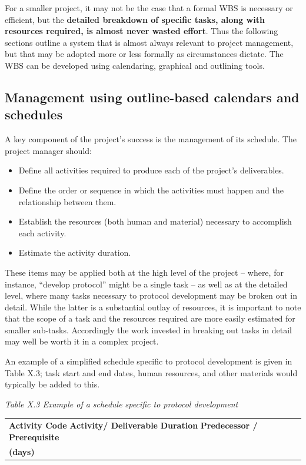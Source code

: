 \documentclass[]{book}
\begin{document}
For a smaller project, it may not be the case that a formal WBS is
necessary or efficient, but the \textbf{detailed breakdown of specific
tasks, along with resources required, is almost never wasted effort}.
Thus the following sections outline a system that is almost always
relevant to project management, but that may be adopted more or less
formally as circumstances dictate. The WBS can be developed using
calendaring, graphical and outlining tools.

\subsection{Management using outline-based calendars and
schedules}\label{management-using-outline-based-calendars-and-schedules}

A key component of the project's success is the management of its
schedule. The project manager should:

\begin{itemize}
\item
  Define all activities required to produce each of the project's
  deliverables.
\item
  Define the order or sequence in which the activities must happen and
  the relationship between them.
\item
  Establish the resources (both human and material) necessary to
  accomplish each activity.
\item
  Estimate the activity duration.
\end{itemize}

These items may be applied both at the high level of the project --
where, for instance, ``develop protocol'' might be a single task -- as
well as at the detailed level, where many tasks necessary to protocol
development may be broken out in detail. While the latter is a
substantial outlay of resources, it is important to note that the scope
of a task and the resources required are more easily estimated for
smaller sub-tasks. Accordingly the work invested in breaking out tasks
in detail may well be worth it in a complex project.

An example of a simplified schedule specific to protocol development is
given in Table X.3; task start and end dates, human resources, and other
materials would typically be added to this.

\emph{Table X.3 Example of a schedule specific to protocol development}

\begin{longtable}[]{@{}l@{}}
\toprule
\begin{minipage}[t]{0.95\columnwidth}\raggedright\strut
\textbf{Activity Code} \textbf{Activity/ Deliverable} \textbf{Duration}
\textbf{Predecessor / Prerequisite}\strut
\end{minipage}\tabularnewline
\begin{minipage}[t]{0.95\columnwidth}\raggedright\strut
\textbf{(days)}\strut
\end{minipage}\tabularnewline
\bottomrule
\end{longtable}
\end{document}
